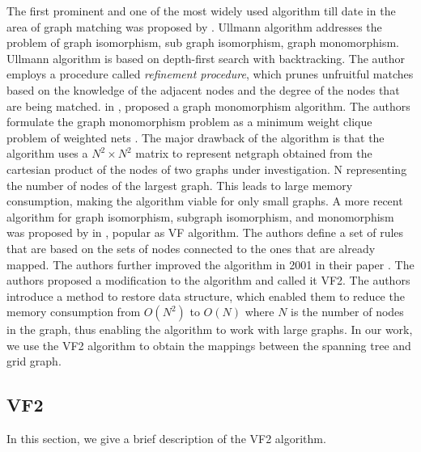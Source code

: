 The first prominent and one of the most widely used algorithm till date in the area of graph matching was proposed by \citeauthor{Ullmann:1976:ASI:321921.321925} \cite{Ullmann:1976:ASI:321921.321925}.
Ullmann algorithm addresses the problem of graph isomorphism, sub graph isomorphism, graph monomorphism. Ullmann algorithm is based on  depth-first search with backtracking.
The author employs a procedure called \textit{refinement procedure}, which prunes unfruitful matches based on the knowledge of the adjacent nodes and the degree of the nodes that are being matched.
\citeauthor{4308468} in \cite{4308468}, proposed a graph monomorphism algorithm.
The authors formulate the graph monomorphism problem as a minimum weight clique problem of weighted nets .
The major drawback of the algorithm is that the algorithm uses a $N^2 \times N^2$ matrix to represent netgraph obtained from the cartesian product of the nodes of two graphs under investigation.
N representing the number of nodes of the largest graph. This leads to large memory consumption, making the algorithm viable for only small graphs.
A more recent algorithm for graph isomorphism, subgraph isomorphism, and monomorphism was proposed by \citeauthor{906251} in \cite{906251}, popular as VF algorithm. 
The authors define a set of rules that are based on the sets of nodes connected to the ones that are already mapped.
The authors further improved the algorithm in 2001 in their paper \cite{cordella2001improved}. 
The authors proposed a modification to the algorithm and called it VF2.
The authors introduce a method to restore data structure, which enabled them to reduce the memory consumption from $O(N^2)$ to $O(N)$ where $N$ is the number of nodes in the graph, thus enabling the algorithm to work with large graphs.
In our work, we use the VF2 algorithm to obtain the mappings between the spanning tree and grid graph.

\subsection{VF2}

In this section, we give a brief description of the VF2 algorithm.

